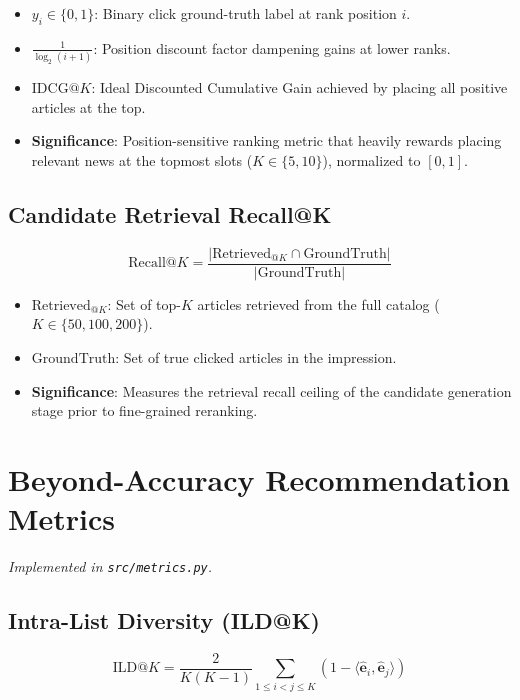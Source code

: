 \documentclass[11pt,a4paper]{article}
\begin{document}
\begin{itemize}
  \item $y_i \in \{0, 1\}$: Binary click ground-truth label at rank position $i$.
  \item $\frac{1}{\log_2(i + 1)}$: Position discount factor dampening gains at lower ranks.
  \item $\text{IDCG}@K$: Ideal Discounted Cumulative Gain achieved by placing all positive articles at the top.
  \item \textbf{Significance}: Position-sensitive ranking metric that heavily rewards placing relevant news at the topmost slots ($K \in \{5, 10\}$), normalized to $[0, 1]$.
\end{itemize}

\subsection{Candidate Retrieval Recall@K}
\begin{equation}
\text{Recall}@K = \frac{|\text{Retrieved}_{@K} \cap \text{GroundTruth}|}{|\text{GroundTruth}|}
\end{equation}

\begin{itemize}
  \item $\text{Retrieved}_{@K}$: Set of top-$K$ articles retrieved from the full catalog ($K \in \{50, 100, 200\}$).
  \item $\text{GroundTruth}$: Set of true clicked articles in the impression.
  \item \textbf{Significance}: Measures the retrieval recall ceiling of the candidate generation stage prior to fine-grained reranking.
\end{itemize}

\section{Beyond-Accuracy Recommendation Metrics}
\textit{Implemented in \texttt{src/metrics.py}.}

\subsection{Intra-List Diversity (ILD@K)}
\begin{equation}
\text{ILD}@K = \frac{2}{K(K - 1)} \sum_{1 \le i < j \le K} \left(1 - \langle \mathbf{\hat{e}}_i, \mathbf{\hat{e}}_j \rangle\right)
\end{equation}
\end{document}
